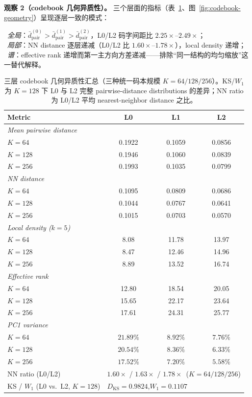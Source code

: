 \documentclass[sigconf, nonacm, anonymize, 9pt]{acmart}
\begin{document}
\noindent\textbf{观察 2（codebook 几何异质性）。} 三个层面的指标（表~\ref{tab:equal-k-pairwise}、图~\ref{fig:codebook-geometry}）呈现逐层一致的模式：

\noindent\textbullet\ \emph{全局}：$\bar d_{\mathrm{pair}}^{(0)}>\bar d_{\mathrm{pair}}^{(1)}>\bar d_{\mathrm{pair}}^{(2)}$，L0/L2 码字间距比 $2.25\times$--$2.49\times$；\\[2pt]
\noindent\textbullet\ \emph{局部}：NN distance 逐层递减（L0/L2 比 $1.60\times$--$1.78\times$），local density 递增；\\[2pt]
\noindent\textbullet\ \emph{谱}：effective rank 递增而第一主方向方差递减——排除``同一结构的均匀缩放''这一替代解释。

\begin{table}[ht]
\centering
\small
\caption{三层 codebook 几何异质性汇总（三种统一码本规模 $K=64/128/256$）。KS/$W_1$ 为 $K=128$ 下 L0 与 L2 完整 pairwise-distance distributions 的差异；NN ratio 为 L0/L2 平均 nearest-neighbor distance 之比。}
\label{tab:equal-k-pairwise}
\begin{tabular}{lccc}
\toprule
Metric & L0 & L1 & L2 \\
\midrule
\multicolumn{4}{l}{\textit{Mean pairwise distance}} \\
$K=64$  & 0.1922 & 0.1059 & 0.0856 \\
$K=128$ & 0.1946 & 0.1060 & 0.0839 \\
$K=256$ & 0.1993 & 0.1035 & 0.0799 \\
\midrule
\multicolumn{4}{l}{\textit{NN distance}} \\
$K=64$  & 0.1095 & 0.0809 & 0.0686 \\
$K=128$ & 0.1044 & 0.0767 & 0.0641 \\
$K=256$ & 0.1015 & 0.0703 & 0.0570 \\
\midrule
\multicolumn{4}{l}{\textit{Local density ($k=5$)}} \\
$K=64$  & 8.08 & 11.78 & 13.97 \\
$K=128$ & 8.47 & 12.46 & 14.96 \\
$K=256$ & 8.89 & 13.52 & 16.74 \\
\midrule
\multicolumn{4}{l}{\textit{Effective rank}} \\
$K=64$  & 12.80 & 18.54 & 20.05 \\
$K=128$ & 15.65 & 22.17 & 23.64 \\
$K=256$ & 17.61 & 24.31 & 25.77 \\
\midrule
\multicolumn{4}{l}{\textit{PC1 variance}} \\
$K=64$  & $21.89\%$ & $8.92\%$ & $7.76\%$ \\
$K=128$ & $20.54\%$ & $8.36\%$ & $6.33\%$ \\
$K=256$ & $17.52\%$ & $7.20\%$ & $5.58\%$ \\
\midrule
NN ratio (L0/L2) & \multicolumn{3}{l}{$1.60\times$ / $1.63\times$ / $1.78\times$\ ($K=64/128/256$)} \\
KS / $W_1$ (L0 vs.\ L2, $K=128$) & \multicolumn{3}{l}{$D_{\mathrm{KS}}=0.9824$,\quad $W_1=0.1107$} \\
\bottomrule
\end{tabular}
\end{table}
\end{document}
